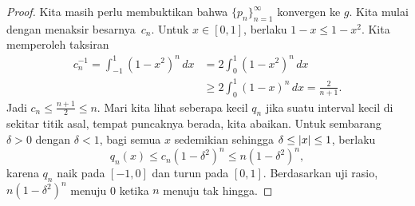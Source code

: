 \begin{proof}
Kita masih perlu membuktikan bahwa $\{ p_n \}_{n=1}^\infty$ konvergen ke $g$.
Kita mulai dengan menaksir besarnya~$c_n$.
Untuk $x \in [0,1]$, berlaku $1-x \leq 1-x^2$.  Kita memperoleh taksiran
\begin{equation*}
\begin{split}
c_n^{-1}   = \int_{-1}^1 {(1-x^2)}^n \, dx
& = 2\int_0^1 {(1-x^2)}^n \, dx \\
& \geq 2\int_0^{1} {(1-x)}^n \, dx
= \frac{2}{n+1} .
\end{split}
\end{equation*}
Jadi $c_n \leq \frac{n+1}{2} \leq n$.
Mari kita lihat seberapa kecil $q_n$ jika suatu interval kecil di sekitar titik asal,
tempat puncaknya berada, kita abaikan.
Untuk sembarang $\delta > 0$ dengan $\delta < 1$,
bagi semua
$x$ sedemikian sehingga $\delta \leq \lvert {x} \rvert \leq 1$, berlaku
\begin{equation*}
q_n(x) \leq c_n {(1-\delta^2)}^n \leq  n{(1-\delta^2)}^n ,
\end{equation*}
karena $q_n$ naik pada $[-1,0]$ dan turun pada $[0,1]$.
Berdasarkan uji rasio,
$n{(1-\delta^2)}^n$ menuju 0 ketika $n$ menuju tak hingga.


\end{proof}
